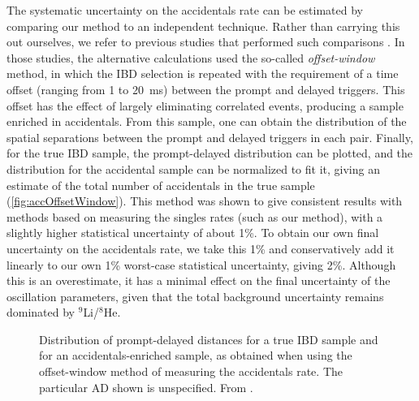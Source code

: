 \documentclass[../thesis.tex]{subfiles}
\begin{document}
The systematic uncertainty on the accidentals rate can be estimated by comparing our method to an independent technique. Rather than carrying this out ourselves, we refer to previous studies that performed such comparisons \cite{An_2017}. In those studies, the alternative calculations used the so-called \emph{offset-window} method, in which the IBD selection is repeated with the requirement of a time offset (ranging from 1 to 20~ms) between the prompt and delayed triggers. This offset has the effect of largely eliminating correlated events, producing a sample enriched in accidentals. From this sample, one can obtain the distribution of the spatial separations between the prompt and delayed triggers in each pair. Finally, for the true IBD sample, the prompt-delayed distribution can be plotted, and the distribution for the accidental sample can be normalized to fit it, giving an estimate of the total number of accidentals in the true sample (\autoref{fig:accOffsetWindow}). This method was shown to give consistent results with methods based on measuring the singles rates (such as our method), with a slightly higher statistical uncertainty of about 1\%. To obtain our own final uncertainty on the accidentals rate, we take this 1\% and conservatively add it linearly to our own 1\% worst-case statistical uncertainty, giving 2\%. Although this is an overestimate, it has a minimal effect on the final uncertainty of the oscillation parameters, given that the total background uncertainty remains dominated by $^9$Li/$^8$He.

\begin{figure}[ht]
  
  \caption{Distribution of prompt-delayed distances for a true IBD sample and for an accidentals-enriched sample, as obtained when using the offset-window method of measuring the accidentals rate. The particular AD shown is unspecified. From \cite{An_2017}.}
    \label{fig:accOffsetWindow}
\end{figure}


\end{document}
